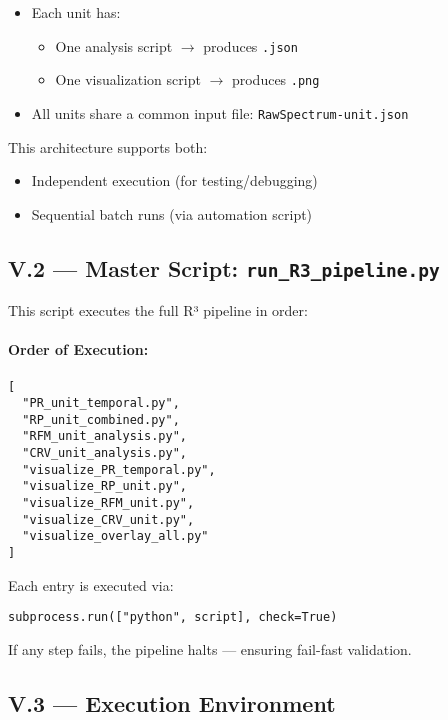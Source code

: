 \documentclass{article}
\begin{document}
\begin{itemize}
    \item Each unit has:
    \begin{itemize}
        \item One analysis script $\rightarrow$ produces \texttt{.json}
        \item One visualization script $\rightarrow$ produces \texttt{.png}
    \end{itemize}
    \item All units share a common input file: \texttt{RawSpectrum-unit.json}
\end{itemize}

This architecture supports both:

\begin{itemize}
    \item Independent execution (for testing/debugging)
    \item Sequential batch runs (via automation script)
\end{itemize}

\subsection*{V.2 — Master Script: \texttt{run\_R3\_pipeline.py}}

This script executes the full R³ pipeline in order:

\paragraph{Order of Execution:}
\begin{verbatim}
[
  "PR_unit_temporal.py",
  "RP_unit_combined.py",
  "RFM_unit_analysis.py",
  "CRV_unit_analysis.py",
  "visualize_PR_temporal.py",
  "visualize_RP_unit.py",
  "visualize_RFM_unit.py",
  "visualize_CRV_unit.py",
  "visualize_overlay_all.py"
]
\end{verbatim}

Each entry is executed via:

\begin{verbatim}
subprocess.run(["python", script], check=True)
\end{verbatim}

If any step fails, the pipeline halts — ensuring fail-fast validation.

\subsection*{V.3 — Execution Environment}
\end{document}
